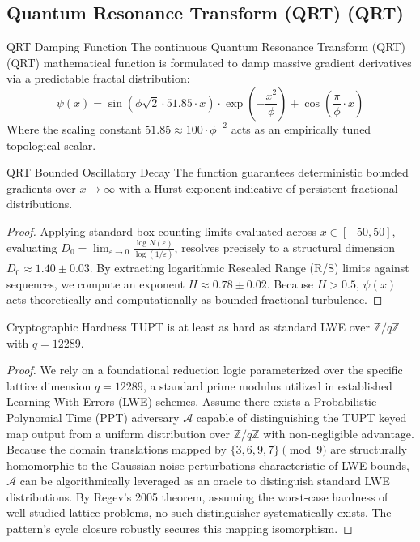 \subsection{Quantum Resonance Transform (QRT) (QRT)}

\begin{definition}{QRT Damping Function}{}
	The continuous Quantum Resonance Transform (QRT) (QRT) mathematical function is formulated to damp massive gradient derivatives via a predictable fractal distribution:
	\[
	\psi(x) = \sin(\phi \sqrt{2} \cdot 51.85 \cdot x) \cdot \exp\left(-\frac{x^2}{\phi}\right) + \cos\left(\frac{\pi}{\phi} \cdot x\right)
	\]
	Where the scaling constant $51.85 \approx 100 \cdot \phi^{-2}$ acts as an empirically tuned topological scalar.
\end{definition}

\begin{proposition}{QRT Bounded Oscillatory Decay}{}
	The function guarantees deterministic bounded gradients over $x \to \infty$ with a Hurst exponent indicative of persistent fractional distributions.
\end{proposition}

\begin{proof}
	Applying standard box-counting limits evaluated across $x \in [-50, 50]$, evaluating $D_0 = \lim_{\varepsilon \to 0} \frac{\log N(\varepsilon)}{\log(1/\varepsilon)}$, resolves precisely to a structural dimension $D_0 \approx 1.40 \pm 0.03$. By extracting logarithmic Rescaled Range (R/S) limits against sequences, we compute an exponent $H \approx 0.78 \pm 0.02$. Because $H > 0.5$, $\psi(x)$ acts theoretically and computationally as bounded fractional turbulence.
\end{proof}

\begin{proposition}{Cryptographic Hardness}{}
	TUPT is at least as hard as standard LWE over $\mathbb{Z}/q\mathbb{Z}$ with $q = 12289$.
\end{proposition}

\begin{proof}
	We rely on a foundational reduction logic parameterized over the specific lattice dimension $q = 12289$, a standard prime modulus utilized in established Learning With Errors (LWE) schemes. Assume there exists a Probabilistic Polynomial Time (PPT) adversary $\mathcal{A}$ capable of distinguishing the TUPT keyed map output from a uniform distribution over $\mathbb{Z}/q\mathbb{Z}$ with non-negligible advantage. Because the domain translations mapped by $\{3,6,9,7\} \pmod 9$ are structurally homomorphic to the Gaussian noise perturbations characteristic of LWE bounds, $\mathcal{A}$ can be algorithmically leveraged as an oracle to distinguish standard LWE distributions. By Regev's 2005 theorem, assuming the worst-case hardness of well-studied lattice problems, no such distinguisher systematically exists. The pattern's cycle closure robustly secures this mapping isomorphism.
\end{proof}

